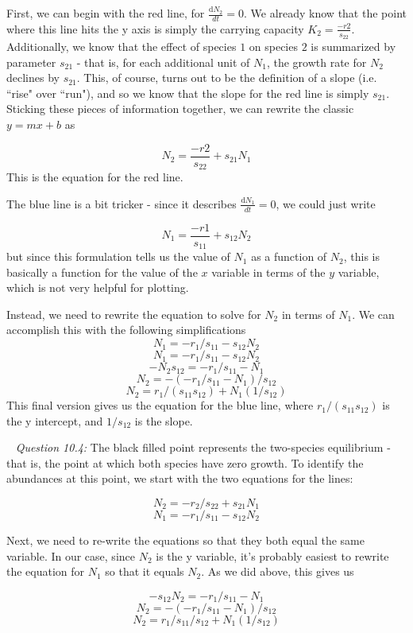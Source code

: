 \documentclass[12pt]{article}
\begin{document}
First, we can begin with the red line, for $\frac{\mathrm{d}N_2}{dt} = 0$. We already know that the point where this line hits the y axis is simply the carrying capacity $K_2 = \frac{-r2}{s_{22}}$. Additionally, we know that the effect of species $1$ on species $2$ is summarized by parameter $s_{21}$ - that is, for each additional unit of $N_1$, the growth rate for $N_2$ declines by $s_{21}$. This, of course, turns out to be the definition of a slope (i.e. ``rise" over ``run"), and so we know that the slope for the red line is simply $s_{21}$. Sticking these pieces of information together, we can rewrite the classic $y = mx +b$ as

$$ N_2 =  \frac{-r2}{s_{22}} + s_{21} N_1$$
This is the equation for the red line.

The blue line is a bit tricker - since it describes $\frac{\mathrm{d}N_1}{dt} = 0$, we could just write

$$ N_1 =  \frac{-r1}{s_{11}} + s_{12} N_2$$
but since this formulation tells us the value of $N_1$ as a function of $N_2$, this is basically a function for the value of the $x$ variable in terms of the $y$ variable, which is not very helpful for plotting.

Instead, we need to rewrite the equation to solve for $N_2$ in terms of $N_1$. We can accomplish this with the following simplifications
$$ N_1 = -r_1/s_{11} - s_{12} N_2 $$ 
$$ N_1 = -r_1/s_{11} - s_{12} N_2 $$ 
$$ - N_2 s_{12} = -r_1/s_{11} - N_1 $$ 
$$ N_2 = -(-r_1/s_{11} - N_1)/s_{12} $$ 
$$ N_2 = r_1/(s_{11}s_{12}) + N_1 (1/s_{12}) $$
This final version gives us the equation for the blue line, where $r_1/(s_{11}s_{12})$ is the y intercept, and $1/s_{12}$ is the slope.

~\newline
\textit{Question 10.4:}
\newline
The black filled point represents the two-species equilibrium - that is, the point at which both species have zero growth. To identify the abundances at this point, we start with the two equations for the lines:

$$ N_2 = -r_2/s_{22} + s_{21} N_1 $$
$$ N_1 = -r_1/s_{11} - s_{12} N_2 $$

Next, we need to re-write the equations so that they both equal the same variable. In our case, since $N_2$ is the y variable, it's probably easiest to rewrite the equation for $N_1$ so that it equals $N_2$. As we did above, this gives us

$$ - s_{12} N_2 = -r_1/s_{11} - N_1 $$
$$ N_2 = - (-r_1/s_{11} - N_1)/s_{12} $$
$$ N_2 = r_1/s_{11}/s_{12} + N_1 (1/s_{12}) $$
\end{document}
